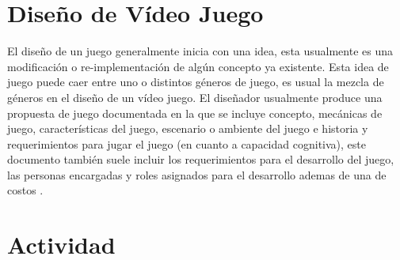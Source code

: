 \section{Diseño de Vídeo Juego}
El diseño de un juego generalmente inicia con una idea, esta usualmente es una modificación o re-implementación de algún concepto ya existente. Esta idea de juego puede caer entre uno o distintos géneros de juego, es usual la mezcla de géneros en el diseño de un vídeo juego. El diseñador usualmente produce una propuesta de juego documentada en la que se incluye concepto, mecánicas de juego, características del juego, escenario o ambiente del juego e historia y requerimientos para jugar el juego (en cuanto a capacidad cognitiva), este documento también suele incluir los requerimientos para el desarrollo del juego, las personas encargadas y roles asignados para el desarrollo ademas de una  de costos \cite[p.~101]{erikgamedevelopment}. 

\section{Actividad}
